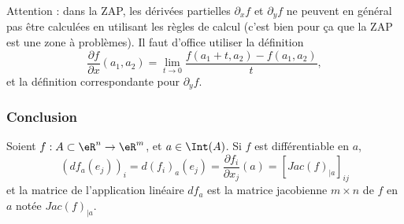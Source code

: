Attention : dans la ZAP, les dérivées partielles \( \partial_xf\) et \( \partial_yf\) ne peuvent en général pas être calculées en utilisant les règles de calcul (c'est bien pour ça que la ZAP est une zone à problèmes). Il faut d'office utiliser la définition
\begin{equation}
	\frac{ \partial f }{ \partial x }(a_1,a_2)=\lim_{t\to 0}\frac{ f(a_1+t,a_2)-f(a_1,a_2) }{ t },
\end{equation}
et la définition correspondante pour \( \partial_yf\).

\subsubsection*{Conclusion}
Soient \( f:A\subset \eR^n \rightarrow \eR^m\), et \( a\in \Int(A)\). Si \( f\) est différentiable en \( a\),
\begin{equation}
	(df_a (e_j))_i = d(f_i)_a(e_j) =\frac{\partial f_i}{\partial x_j}(a)= [Jac(f)_{|a}]_{ij}
\end{equation}
et la matrice de l'application linéaire \( df_a\) est la matrice jacobienne \( m\times n\) de \( f\) en \( a\) notée \( Jac(f)_{|a}\).
